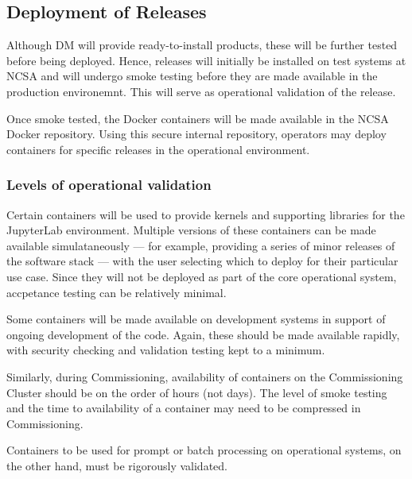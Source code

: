\subsection{Deployment of Releases}\label{sect:reldep}

Although DM will provide ready-to-install products, these will be further tested before being deployed.
Hence, releases will initially be installed on test systems at NCSA and will undergo smoke testing before they are made available in the production environemnt.
This will serve as operational validation of the release.

Once smoke tested, the Docker containers will be made available in the NCSA Docker repository.
Using this secure internal repository, operators may deploy containers for specific releases in the operational environment.

\subsubsection{Levels of operational validation}

Certain containers will be used to provide kernels and supporting libraries for the JupyterLab environment.
Multiple versions of these containers can be made available simulataneously --- for example, providing a series of minor releases of the software stack --- with the user selecting which to deploy for their particular use case.
Since they will not be deployed as part of the core operational system, accpetance testing can be relatively minimal.

Some containers will be made available on development systems in support of ongoing development of the code.
Again, these should be made available rapidly, with security checking and validation testing kept to a minimum.

Similarly, during Commissioning, availability of containers on the Commissioning Cluster should be on the order of hours (not days).
The level of smoke testing and the time to availability of a container may need to be compressed in Commissioning.

Containers to be used for prompt or batch processing on operational systems, on the other hand, must be rigorously validated.
